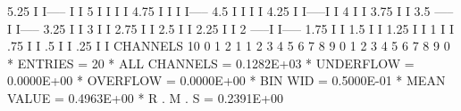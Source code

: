 \begin{Listing}
        5.25                   I                       I-----     I                                 I
        5                      I                            I     I                                 I
        4.75                   I                            I     I                                 I-----
        4.5                    I                            I     I                                      I
        4.25                   I                            I-----I                                      I
        4                      I                                                                         I
        3.75                   I                                                                         I
        3.5               -----I                                                                         I-----
        3.25              I                                                                                   I
        3                 I                                                                                   I
        2.75              I                                                                                   I
        2.5               I                                                                                   I
        2.25              I                                                                                   I
        2            -----I                                                                                   I-----
        1.75         I                                                                                             I
        1.5          I                                                                                             I
        1.25         I                                                                                             I
        1            I                                                                                             I
         .75         I                                                                                             I
         .5          I                                                                                             I
         .25         I                                                                                             I
 CHANNELS  10       0                                            1                                                 2   
            1       1    2    3    4    5    6    7    8    9    0    1    2    3    4    5    6    7    8    9    0   
 * ENTRIES =         20      * ALL CHANNELS = 0.1282E+03      * UNDERFLOW = 0.0000E+00      * OVERFLOW = 0.0000E+00
 * BIN WID = 0.5000E-01      * MEAN VALUE   = 0.4963E+00      * R . M . S = 0.2391E+00
\end{Listing}
